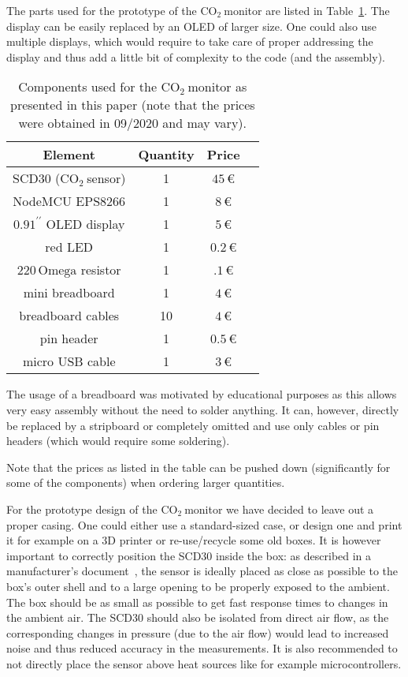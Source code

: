 \documentclass[12pt,a4paper]{article}
\newcommand{\inchsign}{^{\prime\prime}}
\newcommand{\coo}{\ensuremath{\mathrm{CO_2}~}}
\begin{document}
The parts used for the prototype of the \coo monitor are listed in Table~\ref{t:parts}. The display can be easily replaced by an OLED of larger size. One could also use multiple displays, which would require to take care of proper addressing the display and thus add a little bit of complexity to the code (and the assembly). 
\begin{table}\label{t:parts}
\center
\begin{tabular}{cccc}\toprule
Element & Quantity & Price \\\hline
SCD30 (\coo sensor) & 1 & $45\,$\euro \\
NodeMCU EPS8266 & 1 & $8\,$\euro \\
$0.91\inchsign$ OLED display	& 1	& $5\,$\euro \\
red LED					& 1 	& $0.2\,$\euro \\
$220\,\mathrm{Omega}$ resistor	& 1	& $.1\,$\euro \\
mini breadboard		& 1 & $4\,$\euro \\
breadboard cables	& 10 & $4\,$\euro \\
pin header			& 1 & $0.5\,$\euro \\
micro USB cable		& 1 & $3\,$\euro \\
\bottomrule
\end{tabular}
\caption{Components used for the \coo monitor as presented in this paper (note that the prices were obtained in 09/2020 and may vary).}
\end{table}

The usage of a breadboard was motivated by educational purposes as this allows very easy assembly without the need to solder anything. It can, however, directly be replaced by a stripboard or completely omitted and use only cables or pin headers (which would require some soldering). 

Note that the prices as listed in the table can be pushed down (significantly for some of the components) when ordering larger quantities. 

For the prototype design of the \coo monitor we have decided to leave out a proper casing. One could either use a standard-sized case, or design one and print it for example on a 3D printer or re-use/recycle some old boxes. It is however important to correctly position the SCD30 inside the box: as described in a manufacturer's document~\cite{SENSIRION2020A}, the sensor is ideally placed as close as possible to the box's outer shell and to a large opening to be properly exposed to the ambient. The box should be as small as possible to get fast response times to changes in the ambient air. The SCD30 should also be isolated from direct air flow, as the corresponding changes in pressure (due to the air flow) would lead to increased noise and thus reduced accuracy in the measurements. It is also recommended to not directly place the sensor above heat sources like for example microcontrollers.
\end{document}
